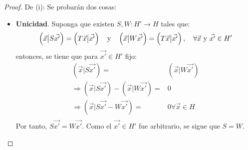\documentclass[12pt]{report}
\newcounter{it}
\theoremstyle{largebreak}
\newcommand\cf[3]{\ensuremath{#1:#2\rightarrow#3}}
\newcommand\pint[2]{\ensuremath{\left(#1\big|#2\right)}}
\begin{document}
    \begin{proof}
        De (i): Se probarán dos cosas:
        \begin{itemize}
            \item \textbf{Unicidad}. Suponga que existen $\cf{S,W}{H'}{H}$ tales que:
            \begin{equation*}
                \pint{\vec{x}}{S\vec{x'}}=\pint{T\vec{x}}{\vec{x'}}\quad\textup{y}\quad\pint{\vec{x}}{W\vec{x'}}=\pint{T\vec{x}}{\vec{x'}},\quad\forall\vec{x}\textup{ y }\vec{x'}\in H'
            \end{equation*}
            entonces, se tiene que para $\vec{x'}\in H'$ fijo:
            \begin{equation}
                \begin{split}
                    \pint{\vec{x}}{S\vec{x'}}=&\pint{\vec{x}}{W\vec{x'}}\\
                    \Rightarrow \pint{\vec{x}}{S\vec{x'}}-\pint{\vec{x}}{W\vec{x'}}=&0\\
                    \Rightarrow \pint{\vec{x}}{S\vec{x'}-W\vec{x'}}=&0\forall\vec{x}\in H \\
                \end{split}
            \end{equation}
            Por tanto, $S\vec{x'}=W\vec{x'}$. Como el $\vec{x'}\in H'$ fue arbitrario, se sigue que $S=W$.


\end{itemize}
\end{proof}
\end{document}
